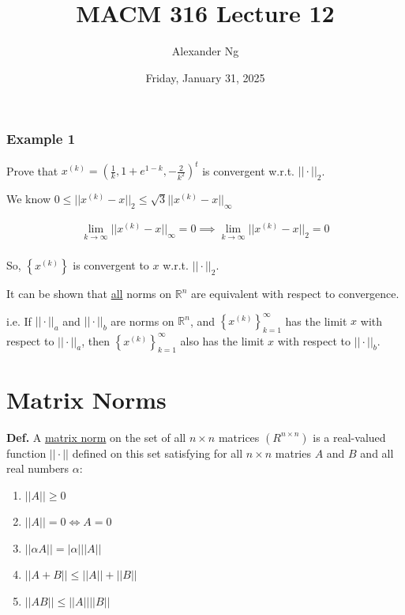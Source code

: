 \documentclass[12pt]{article}
\begin{document}
\setlength{\arraycolsep}{12pt}

\newcommand{\defn}{\textbf{Def.}\xspace}
\newcommand{\thm}{\textbf{Thm.}\xspace}
\newcommand{\ex}{\textbf{Ex.}\xspace}
\renewcommand{\arraystretch}{1.25} %

\title{MACM 316 Lecture 12}
\author{Alexander Ng}
\date{Friday, January 31, 2025}

\maketitle

\subsubsection*{Example 1}

Prove that $x^{(k)} = \left(\frac{1}{k}, 1+e^{1-k}, -\frac{2}{k^2}\right)^t$
is convergent w.r.t. $||\cdot||_2$.

We know $0 \leq ||x^{(k)}-x||_2 \leq \sqrt{3}||x^{(k)}-x||_{\infty}$

\begin{eqnarray*}
  \lim_{k \to \infty} ||x^{(k)}-x||_{\infty} = 0 \implies \lim_{k \to \infty}
  ||x^{(k)}-x||_2 = 0 \\
\end{eqnarray*}

So, $\left\{x^{(k)}\right\}$ is convergent to $x$ w.r.t. $||\cdot||_2$.

It can be shown that \uline{all} norms on $\mathbb{R}^n $ are equivalent with
respect to convergence.

i.e. If $||\cdot||_a$ and $||\cdot||_b$ are norms on $\mathbb{R}^n$, and
$\left\{x^{(k)}\right\}_{k=1}^{\infty}$ has the limit $x$ with respect to
$||\cdot||_a$, then $\left\{x^{(k)}\right\}_{k=1}^{\infty}$ also has the limit
$x$ with respect to $||\cdot||_b$.

\section{Matrix Norms}

\textbf{Def.} A \uline{matrix norm} on the set of all $n \times n$ matrices 
$(R^{n \times n})$ is a real-valued function $||\cdot||$ defined on this set
satisfying for all $n \times n$ matries $A$ and $B$ and all real numbers
$\alpha:$

\begin{enumerate}
  \item $||A|| \geq 0$
  \item $||A|| = 0 \iff A=0$
  \item $||\alpha A|| = |\alpha| ||A||$
  \item $||A+B|| \leq ||A|| + ||B||$
  \item $||AB|| \leq ||A|| ||B||$
\end{enumerate}
\end{document}
